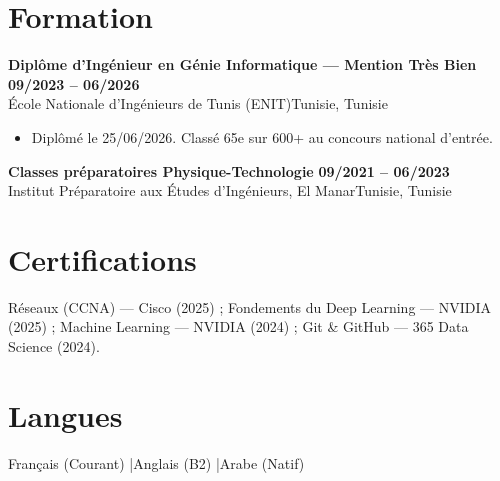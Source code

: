\documentclass[a4paper,9pt]{article}
\newcommand{\cventry}[4]{\textbf{#1} \hfill \textbf{#4}\\[0.2pt]#2{\ifx\relax#3\relax\else, #3\fi}\par\vspace{0.3pt}}
\begin{document}
\section{Formation}
\cventry{Diplôme d'Ingénieur en Génie Informatique --- Mention Très Bien}{École Nationale d'Ingénieurs de Tunis (ENIT)}{Tunisie}{09/2023 -- 06/2026}
\begin{itemize}
  \item Diplômé le 25/06/2026. Classé 65e sur 600+ au concours national d'entrée.
\end{itemize}
\cventry{Classes préparatoires Physique-Technologie}{Institut Préparatoire aux Études d'Ingénieurs, El Manar}{Tunisie}{09/2021 -- 06/2023}
\section{Certifications}
Réseaux (CCNA) --- Cisco (2025) ; Fondements du Deep Learning --- NVIDIA (2025) ; Machine Learning --- NVIDIA (2024) ; Git \& GitHub --- 365 Data Science (2024).
\section{Langues}
Français (Courant) \quad|\quad Anglais (B2) \quad|\quad Arabe (Natif)
\end{document}
